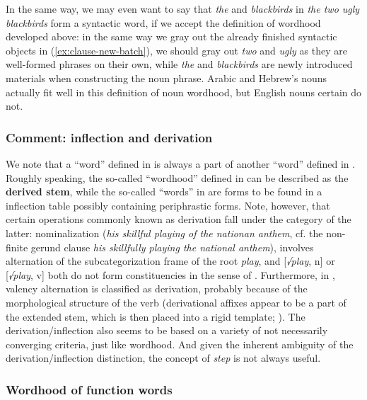 \documentclass[a4paper, oneside, scheme=plain, 12pt]{article}
\newcommand*{\concept}[1]{\textbf{#1}}
\newcommand*{\term}[1]{\emph{#1}}
\newcommand{\form}[1]{\emph{#1}}
\begin{document}
In the same way, we may even want to say that \form{the} and \form{blackbirds} 
in \form{the two ugly blackbirds} form a syntactic word,
if we accept the definition of wordhood developed above:
in the same way we gray out the already finished syntactic objects in (\ref{ex:clause-new-batch}),
we should gray out \form{two} and \form{ugly} as they are well-formed phrases on their own,
while \form{the} and \form{blackbirds} are newly introduced materials
when constructing the noun phrase.
Arabic and Hebrew's nouns actually fit well in this definition of noun wordhood,
but English nouns certain do not.

\subsubsection{Comment: inflection and derivation}\label{sec:inflection-derivation}

We note that a ``word'' defined in 
is always a part of another ``word'' defined in .
Roughly speaking, the so-called ``wordhood'' defined in 
can be described as the \concept{derived stem},
while the so-called ``words'' in 
are forms to be found in a inflection table possibly containing periphrastic forms.
Note, however, that certain operations commonly known as derivation
fall under the category of the latter:
nominalization (\form{his skillful playing of the nationan anthem},
cf. the non-finite gerund clause \form{his skillfully playing the national anthem}),
involves alternation of the subcategorization frame of the root \form{play},
and [\form{√play}, n] or [\form{√play}, v] both do not form constituencies
in the sense of .
Furthermore, in \citet{jacques2021grammar}, valency alternation is classified as derivation,
probably because of the morphological structure of the verb
(derivational affixes appear to be a part of the extended stem,
which is then placed into a rigid template; ).
The derivation/inflection also seems to be based on a variety of 
not necessarily converging criteria, just like wordhood.
And given the inherent ambiguity of the derivation/inflection distinction,
the concept of \term{step} is not always useful.

\subsubsection{Wordhood of function words}\label{sec:no-function-word-in-syntax}
\end{document}
